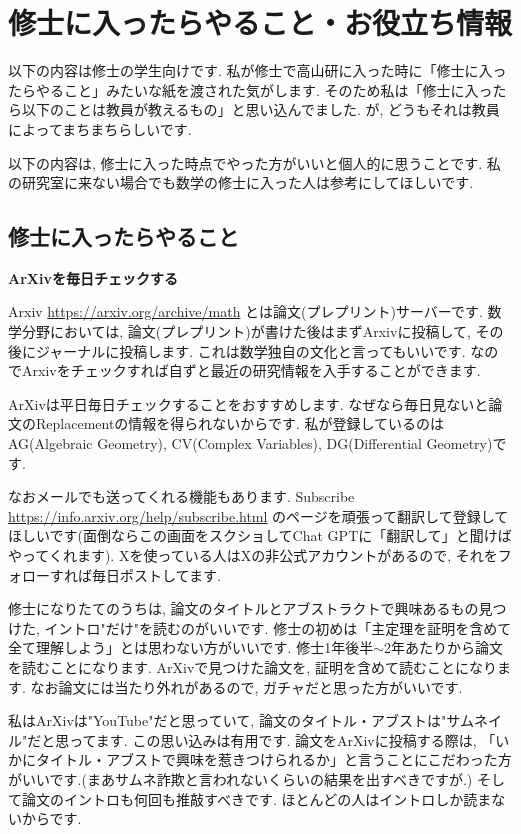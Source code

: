\section{修士に入ったらやること・お役立ち情報}
\label{sec-3}
以下の内容は修士の学生向けです. 
私が修士で高山研に入った時に「修士に入ったらやること」みたいな紙を渡された気がします. 
そのため私は「修士に入ったら以下のことは教員が教えるもの」と思い込んでました.  
が, どうもそれは教員によってまちまちらしいです. 

以下の内容は, 修士に入った時点でやった方がいいと個人的に思うことです. 
 私の研究室に来ない場合でも数学の修士に入った人は参考にしてほしいです. 

\subsection{修士に入ったらやること}

\textbf{ArXivを毎日チェックする}  　\vspace{-6pt} 

Arxiv \url{https://arxiv.org/archive/math} とは論文(プレプリント)サーバーです. 
数学分野においては, 論文(プレプリント)が書けた後はまずArxivに投稿して, その後にジャーナルに投稿します. これは数学独自の文化と言ってもいいです.
なのでArxivをチェックすれば自ずと最近の研究情報を入手することができます. 

ArXivは平日毎日チェックすることをおすすめします. なぜなら毎日見ないと論文のReplacementの情報を得られないからです. 私が登録しているのはAG(Algebraic Geometry), CV(Complex Variables), DG(Differential Geometry)です. 

なおメールでも送ってくれる機能もあります. 
Subscribe \url{https://info.arxiv.org/help/subscribe.html} のページを頑張って翻訳して登録してほしいです(面倒ならこの画面をスクショしてChat GPTに「翻訳して」と聞けばやってくれます). 
Xを使っている人はXの非公式アカウントがあるので, それをフォローすれば毎日ポストしてます. 

修士になりたてのうちは, 論文のタイトルとアブストラクトで興味あるもの見つけた, イントロ"だけ"を読むのがいいです. 修士の初めは「主定理を証明を含めて全て理解しよう」とは思わない方がいいです. 
修士1年後半$\sim$2年あたりから論文を読むことになります. 
ArXivで見つけた論文を, 証明を含めて読むことになります. なお論文には当たり外れがあるので, ガチャだと思った方がいいです. 

私はArXivは"YouTube"だと思っていて, 論文のタイトル・アブストは"サムネイル"だと思ってます. この思い込みは有用です. 論文をArXivに投稿する際は, 「いかにタイトル・アブストで興味を惹きつけられるか」と言うことにこだわった方がいいです.(まあサムネ詐欺と言われないくらいの結果を出すべきですが.)
そして論文のイントロも何回も推敲すべきです. ほとんどの人はイントロしか読まないからです. 
\vspace{8pt} 

